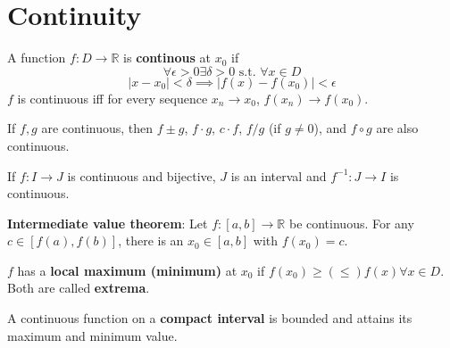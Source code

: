\section{Continuity}

\begin{definition}
A function $f: D \to \mathbb{R}$ is \textbf{continous} at $x_0$ if
$$\forall \epsilon \gt 0 \exists \delta \gt 0 \text{ s.t. } \forall x \in D $$
$$| x - x_0 | \lt \delta \implies | f(x) - f(x_0) | \lt \epsilon$$
$f$ is continuous iff for every sequence $x_n \to x_0$, $f(x_n) \to f(x_0)$.
\end{definition}

\begin{theorem}
If $f, g$ are continuous, then $f \pm g$, $f \cdot g$, $c \cdot f$, $f/g$ (if $g \neq 0$), and $f \circ g$ are also continuous.
\end{theorem}

\begin{theorem}
If $f: I \to J$ is continuous and bijective, $J$ is an interval and $f^{-1}: J \to I$ is continuous.
\end{theorem}

\begin{theorem}
\textbf{Intermediate value theorem}: Let $f: [a, b] \to \mathbb{R}$ be continuous. For any $c \in [f(a), f(b)]$, there is an $x_0 \in [a, b]$ with $f(x_0) = c$.
\end{theorem}

\begin{definition}
$f$ has a \textbf{local maximum (minimum)} at $x_0$ if $f(x_0) \geq (\leq) f(x) \forall x \in D$. Both are called \textbf{extrema}.
\end{definition}

\begin{theorem}
A continuous function on a \textbf{compact interval} is bounded and attains its maximum and minimum value.
\end{theorem}
